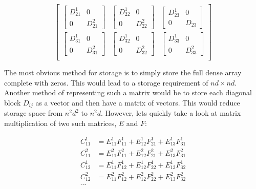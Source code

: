 \documentclass[letterpaper, 10pt, twoside]{article}
\begin{document}
\[\begin{bmatrix}
	\begin{bmatrix}
	D_{21}^1& 0 \\
	0 & D_{21}^2
	\end{bmatrix} &
	\begin{bmatrix}
	D_{22}^1& 0 \\
	0 & D_{22}^2 
	\end{bmatrix} &
	\begin{bmatrix}
	D_{23}^1& 0 \\
	0 & D_{23} 
	\end{bmatrix} \\
	
	\begin{bmatrix}
	D_{31}^1& 0 \\
	0 & D_{31}^2
	\end{bmatrix} &
	\begin{bmatrix}
	D_{32}^1& 0 \\
	0 & D_{32}^2 
	\end{bmatrix} &
	\begin{bmatrix}
	D_{33}^1 & 0\\
	0 & D_{33}^2
	\end{bmatrix} \\
	\end{bmatrix} 
	\]
	
	The most obvious method for storage is to simply store the full dense array complete with zeros. This would lead to a storage requirement of $nd\times nd$. 
	Another method of representing such a matrix would be to store each diagonal block $D_{ij}$ as a vector and then have a matrix of vectors. This would reduce storage space from $n^2d^2$ to $n^2d$. However, lets quickly take a look at matrix multiplication of two such matrices, $E$ and $F$:
	
	\begin{align*}
		C_{11}^1 &= E_{11}^1F_{11}^1 + E_{12}^1F_{21}^1 + E_{13}^1F_{31}^1 \\
		C_{11}^2 &= E_{11}^2F_{11}^2 + E_{12}^2F_{21}^2 + E_{13}^2F_{31}^2 \\
		C_{12}^1 &= E_{11}^1F_{12}^1 + E_{12}^1F_{22}^1 + E_{13}^1F_{32}^1 \\
		C_{12}^2 &= E_{11}^2F_{12}^2 + E_{12}^2F_{22}^2 + E_{13}^2F_{32}^2 \\
		\cdots
	\end{align*}
	
\end{document}

